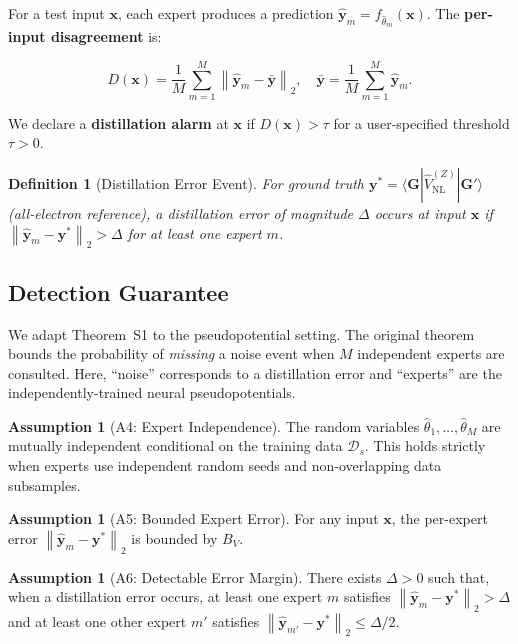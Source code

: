 \documentclass[11pt,a4paper]{article}
\newtheorem{definition}[theorem]{Definition}
\theoremstyle{definition}
\newtheorem{assumption}[theorem]{Assumption}
\newcommand{\norm}[1]{\left\lVert#1\right\rVert}
\newcommand{\ThmSCXNoise}{Theorem~S1}
\begin{document}
For a test input $\mathbf{x}$, each expert produces a prediction $\hat{\mathbf{y}}_m = f_{\hat{\theta}_m}(\mathbf{x})$. The \textbf{per-input disagreement} is:

\begin{equation}\label{eq:disagreement}
D(\mathbf{x}) = \frac{1}{M}\sum_{m=1}^M \norm{\hat{\mathbf{y}}_m - \bar{\mathbf{y}}}_2, \quad \bar{\mathbf{y}} = \frac{1}{M}\sum_{m=1}^M \hat{\mathbf{y}}_m.
\end{equation}

We declare a \textbf{distillation alarm} at $\mathbf{x}$ if $D(\mathbf{x}) > \tau$ for a user-specified threshold $\tau > 0$.

\begin{definition}[Distillation Error Event]\label{def:error_event}
For ground truth $\mathbf{y}^* = \langle \mathbf{G} | \hat{V}_{\mathrm{NL}}^{(Z)} | \mathbf{G}' \rangle$ (all-electron reference), a distillation error of magnitude $\Delta$ occurs at input $\mathbf{x}$ if $\norm{\hat{\mathbf{y}}_m - \mathbf{y}^*}_2 > \Delta$ for at least one expert $m$.
\end{definition}

\subsection{Detection Guarantee}

We adapt \ThmSCXNoise{} to the pseudopotential setting. The original theorem bounds the probability of \textit{missing} a noise event when $M$ independent experts are consulted. Here, ``noise'' corresponds to a distillation error and ``experts'' are the independently-trained neural pseudopotentials.

\begin{assumption}[A4: Expert Independence]\label{ass:A4}
The random variables $\hat{\theta}_1, \ldots, \hat{\theta}_M$ are mutually independent conditional on the training data $\mathcal{D}_s$. This holds strictly when experts use independent random seeds and non-overlapping data subsamples.
\end{assumption}

\begin{assumption}[A5: Bounded Expert Error]\label{ass:A5}
For any input $\mathbf{x}$, the per-expert error $\norm{\hat{\mathbf{y}}_m - \mathbf{y}^*}_2$ is bounded by $B_V$.
\end{assumption}

\begin{assumption}[A6: Detectable Error Margin]\label{ass:A6}
There exists $\Delta > 0$ such that, when a distillation error occurs, at least one expert $m$ satisfies $\norm{\hat{\mathbf{y}}_m - \mathbf{y}^*}_2 > \Delta$ and at least one other expert $m'$ satisfies $\norm{\hat{\mathbf{y}}_{m'} - \mathbf{y}^*}_2 \leq \Delta/2$.
\end{assumption}
\end{document}
